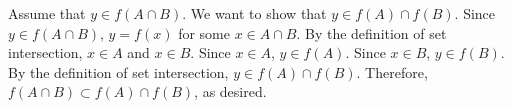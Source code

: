 Assume that $y \in f(A \cap B)$.
We want to show that $y \in f(A) \cap f(B)$.
Since $y \in f(A \cap B)$, $y = f(x)$ for some $x \in A \cap B$.
By the definition of set intersection, $x \in A$ and $x \in B$.
Since $x \in A$, $y \in f(A)$.
Since $x \in B$, $y \in f(B)$.
By the definition of set intersection, $y \in f(A) \cap f(B)$.
Therefore, $f(A \cap B) \subset f(A) \cap f(B)$, as desired.
\bye
